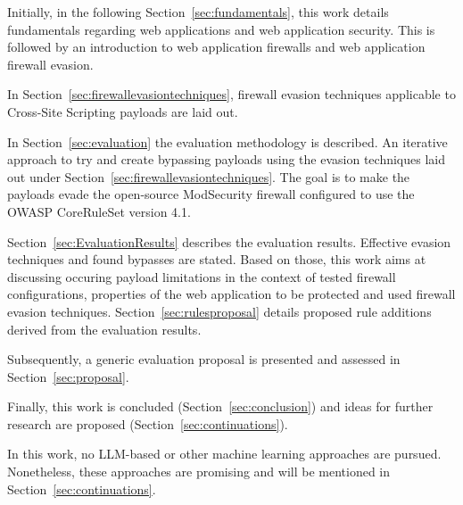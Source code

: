 Initially, in the following Section~\ref{sec:fundamentals}, this work details fundamentals regarding web applications and web application security. This is followed by an introduction to web application firewalls and web application firewall evasion.

In Section~\ref{sec:firewallevasiontechniques}, firewall evasion techniques applicable to Cross-Site Scripting payloads are laid out.

In Section~\ref{sec:evaluation} the evaluation methodology is described. An iterative approach to try and create bypassing payloads using the evasion techniques laid out under Section~\ref{sec:firewallevasiontechniques}. The goal is to make the payloads evade the open-source ModSecurity firewall configured to use the OWASP CoreRuleSet version 4.1.

Section~\ref{sec:EvaluationResults} describes the evaluation results. Effective evasion techniques and found bypasses are stated. Based on those, this work aims at discussing occuring payload limitations in the context of tested firewall configurations, properties of the web application to be protected and used firewall evasion techniques. Section~\ref{sec:rulesproposal} details proposed rule additions derived from the evaluation results.

Subsequently, a generic evaluation proposal is presented and assessed in Section~\ref{sec:proposal}.

Finally, this work is concluded (Section~\ref{sec:conclusion}) and ideas for further research are proposed (Section~\ref{sec:continuations}).

In this work, no LLM-based or other machine learning approaches are pursued. Nonetheless, these approaches are promising and will be mentioned in Section~\ref{sec:continuations}.
